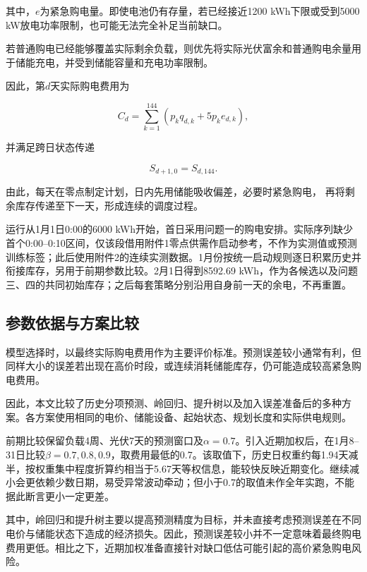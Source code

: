 其中，$e$为紧急购电量。即使电池仍有存量，若已经接近1200 kWh下限或受到5000 kW放电功率限制，也可能无法完全补足当前缺口。

若普通购电已经能够覆盖实际剩余负载，则优先将实际光伏富余和普通购电余量用于储能充电，并受到储能容量和充电功率限制。

因此，第$d$天实际购电费用为

\begin{equation}
C_d
=
\sum_{k=1}^{144}
\left(
p_kq_{d,k}
+
5p_ke_{d,k}
\right),
\label{eq:q2_daily_cost}
\end{equation}

并满足跨日状态传递

\begin{equation}
S_{d+1,0}=S_{d,144}.
\label{eq:q2_cross_day}
\end{equation}

由此，每天在零点制定计划，日内先用储能吸收偏差，必要时紧急购电，
再将剩余库存传递至下一天，形成连续的调度过程。

运行从1月1日0:00的6000 kWh开始，首日采用问题一的购电安排。实际序列缺少首个0:00--0:10区间，仅该段借用附件1零点供需作启动参考，不作为实测值或预测训练标签；此后使用附件2的连续实测数据。1月份按统一启动规则逐日积累历史并衔接库存，另用于前期参数比较。2月1日得到8592.69 kWh，作为各候选以及问题三、四的共同初始库存；之后每套策略分别沿用自身前一天的余电，不再重置。


\subsection{参数依据与方案比较}

模型选择时，以最终实际购电费用作为主要评价标准。预测误差较小通常有利，但同样大小的误差若出现在高价时段，或连续消耗储能库存，仍可能造成较高紧急购电费用。

因此，本文比较了历史分项预测、岭回归、提升树以及加入误差准备后的多种方案。各方案使用相同的电价、储能设备、起始状态、规划长度和实际供电规则。

前期比较保留负载4周、光伏7天的预测窗口及$\alpha=0.7$。引入近期加权后，在1月8--31日比较$\beta=0.7,0.8,0.9$，取费用最低的0.7。该取值下，历史日权重约每1.94天减半，按权重集中程度折算约相当于5.67天等权信息，能较快反映近期变化。继续减小会更依赖少数日期，易受异常波动牵动；但小于0.7的取值未作全年实跑，不能据此断言更小一定更差。

其中，岭回归和提升树主要以提高预测精度为目标，并未直接考虑预测误差在不同电价与储能状态下造成的经济损失。因此，预测误差较小并不一定意味着最终购电费用更低。相比之下，近期加权准备直接针对缺口低估可能引起的高价紧急购电风险。

